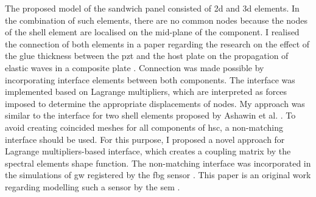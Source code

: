 \documentclass[11pt,a4paper,final]{report}
\theoremstyle{plain}
\begin{document}
The proposed model of the sandwich panel consisted of \ac{2d} and \ac{3d} elements.
In the combination of such elements, there are no common nodes because the nodes of the shell element are localised on the mid-plane of the component.
I realised the connection of both elements in a paper regarding the research on the effect of the glue thickness between the \ac{pzt} and the host plate on the propagation of elastic waves in a composite plate \cite{fiborek20192d}.
Connection was made possible by incorporating interface elements between both components.
The interface was implemented based on Lagrange multipliers, which are interpreted as forces imposed to determine the appropriate displacements of nodes. My approach was similar to the interface for two shell elements proposed by Ashawin et al. \cite{ashwin2014formulation}.
To avoid creating coincided meshes for all components of \ac{hsc}, a non-matching interface should be used.
For this purpose, I proposed a novel approach for Lagrange multipliers-based interface, which creates a coupling matrix by the spectral elements shape function.
The non-matching interface was incorporated in the simulations of \ac{gw} registered by the \ac{fbg} sensor \cite{fiborek2022spectral}.
This paper is an original work regarding modelling such a sensor by the \ac{sem} \cite{fiborek2022spectral}.
\end{document}
